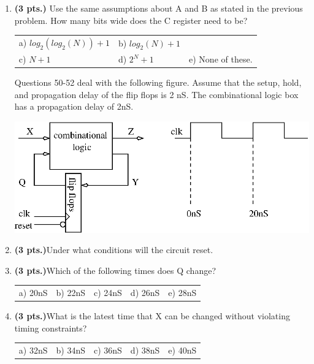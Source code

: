 \documentclass{article}
\begin{document}
\begin{enumerate}
\item {\bf (3 pts.)} Use the same assumptions about A and B as stated in the previous
problem.  How many bits wide does the C register need to be?

\begin{tabular}{p{1.30in}p{1.3in}p{2.00in}}
a) $log_2(log_2(N))+1$ & b) $log_2(N)+1$ &   \\
c) $N+1$ & d) $2^N+1$ & e) None of these.\\
\end{tabular}

Questions 50-52 deal with the following figure.  Assume that the
setup, hold, and propagation delay of the flip flops is 2 nS.
The combinational logic box has a propagation delay of 2nS.

\includegraphics{./Fig3/fsm.eps}

\item {\bf (3 pts.)}Under what conditions will the circuit reset.

\item {\bf (3 pts.)}Which of the following times does Q change?

\begin{tabular}{p{0.75in}p{0.75in}p{0.75in}p{0.75in}p{0.75in}}
a) 20nS  & b) 22nS  & c) 24nS & d) 26nS & e) 28nS \\
\end{tabular}

\item {\bf (3 pts.)}What is the latest time that X can be changed
without violating timing constraints?

\begin{tabular}{p{0.75in}p{0.75in}p{0.75in}p{0.75in}p{0.75in}}
a) 32nS  & b) 34nS  & c) 36nS & d) 38nS & e) 40nS \\
\end{tabular}

\end{enumerate}
\end{document}
